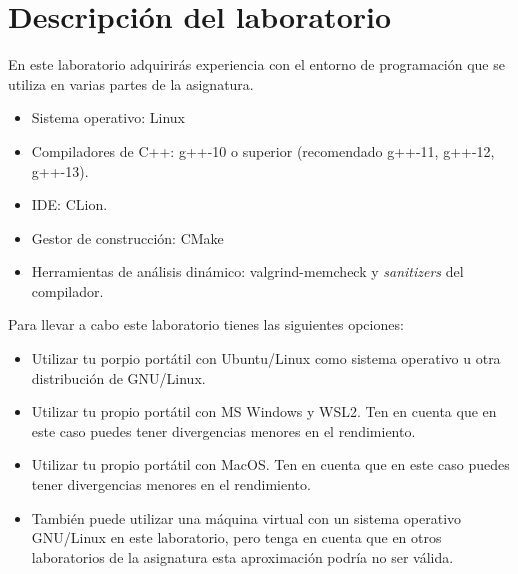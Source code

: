 \section{Descripción del laboratorio}

En este laboratorio adquirirás experiencia con el entorno de programación que se utiliza en varias partes
de la asignatura.

\begin{itemize}
  \item Sistema operativo: Linux
  \item Compiladores de C++: g++-10 o superior (recomendado g++-11, g++-12, g++-13).
  \item IDE: CLion.
  \item Gestor de construcción: CMake
  \item Herramientas de análisis dinámico: valgrind-memcheck y \emph{sanitizers} del compilador.
\end{itemize}

Para llevar a cabo este laboratorio tienes las siguientes opciones:
\begin{itemize}
  \item Utilizar tu porpio portátil con Ubuntu/Linux como sistema operativo 
        u otra distribución de GNU/Linux.
  \item Utilizar tu propio portátil con MS Windows y WSL2. 
        Ten en cuenta que en este caso puedes tener divergencias menores en el rendimiento.
  \item Utilizar tu propio portátil con MacOS.
        Ten en cuenta que en este caso puedes tener divergencias menores en el rendimiento.
  \item También puede utilizar una máquina virtual con un sistema operativo GNU/Linux
        en este laboratorio, pero tenga en cuenta que en otros laboratorios de la
        asignatura esta aproximación podría no ser válida.
\end{itemize}
